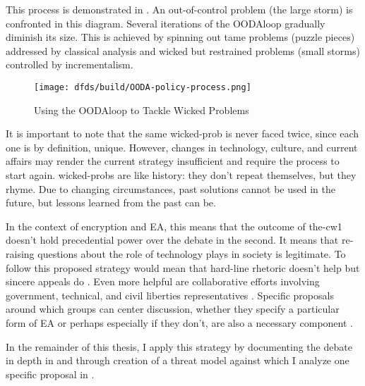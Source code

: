 
This process is demonstrated in . An out-of-control problem (the large storm) is
confronted in this diagram. Several iterations of the \ac{OODAloop} gradually diminish its size. This is achieved by
spinning out tame problems (puzzle pieces) addressed by classical analysis and wicked but restrained problems (small
storms) controlled by \ac{incrementalism}.

\begin{figure}[h]
  \centering\CaptionFontSize
  \texttt{[image: dfds/build/OODA-policy-process.png]}
  \caption{Using the \ac{OODAloop} to Tackle Wicked Problems}
  \label{fig-policy-ooda-process}
\end{figure}

It is important to note that the same \ac{wicked-prob} is never faced twice, since each one is by definition, unique.
However, changes in technology, culture, and current affairs may render the current strategy insufficient and require
the process to start again. \Acp{wicked-prob} are like history: they don't repeat themselves, but they rhyme. Due to
changing circumstances, past solutions cannot be used in the future, but lessons learned from the past can be.

In the context of \ac{encryption} and \ac{EA}, this means that the outcome of \ac{the-cw1} doesn't hold precedential
power over the debate in the second. It means that re-raising questions about the role of technology plays in society is
legitimate. To follow this proposed strategy would mean that hard-line rhetoric doesn't help \cite{ruiz_there_2018}
\cite{geller_2019} but sincere appeals do \cite{abelson_2015} \cite{intl_2020} \cite{rozenshtein_2019}. Even more
helpful are collaborative efforts involving government, technical, and civil liberties representatives
\cite{committee_decrypting_2018} \cite{group_2019}. Specific proposals around which groups can center discussion,
whether they specify a particular form of \ac{EA} or perhaps especially if they don't, are also a necessary component
\cite{kerr_encryption_2017} \cite{wright_crypto_2018} \cite{phan_key_2017}.

In the remainder of this thesis, I apply this strategy by documenting the debate in depth in  and
through creation of a threat model against which I analyze one specific proposal in .
